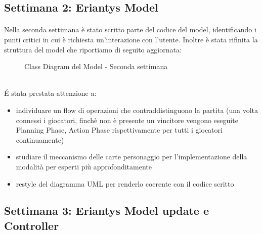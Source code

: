 \documentclass[a4paper, 12pt]{article}
\begin{document}
	\subsection{Settimana 2: Eriantys Model}
	\paragraph{}
	Nella seconda settimana è stato scritto parte del codice del model, identificando i punti critici in cui è richiesta un'interazione con l'utente. Inoltre è stata rifinita la struttura del model che riportiamo di seguito aggiornata:\\
	\begin{figure}[h]
		\centering
		\def\svgwidth{\columnwidth}
		\resizebox{\linewidth}{!}{}
		\caption{Class Diagram del Model - Seconda settimana}
	\end{figure}\\
	É stata prestata attenzione a:
		\begin{itemize}
		\setlength{\parskip}{0pt}
		\setlength{\parsep}{0pt}
		
		\item individuare un flow di operazioni che contraddistinguono la partita (una volta connessi i giocatori, finchè non è presente un vincitore vengono eseguite Planning Phase, Action Phase rispettivamente per tutti i giocatori continuamente)
		\item studiare il meccanismo delle carte personaggio per l'implementazione della modalità per esperti più approfonditamente
		\item restyle del diagramma UML per renderlo coerente con il codice scritto
	\end{itemize}
	\subsection{Settimana 3: Eriantys Model update e Controller}
\end{document}
